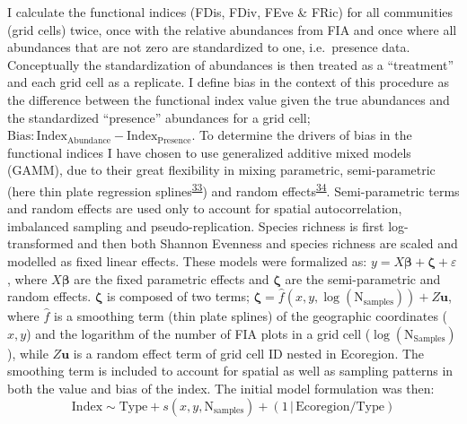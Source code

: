 \documentclass[
  10pt,
]{article}
\begin{document}
I calculate the functional indices (FDis, FDiv, FEve \& FRic) for all communities (grid cells) twice, once with the relative abundances from FIA and once where all abundances that are not zero are standardized to one, i.e.~presence data. Conceptually the standardization of abundances is then treated as a ``treatment'' and each grid cell as a replicate. I define bias in the context of this procedure as the difference between the functional index value given the true abundances and the standardized ``presence'' abundances for a grid cell; \(\mathrm{Bias}: \mathrm{Index_{Abundance}} - \mathrm{Index_{Presence}}\). To determine the drivers of bias in the functional indices I have chosen to use generalized additive mixed models (GAMM), due to their great flexibility in mixing parametric, semi-parametric (here thin plate regression splines\textsuperscript{\protect\hyperlink{ref-R-mgcv-5}{33}}) and random effects\textsuperscript{\protect\hyperlink{ref-R-gamm4}{34}}. Semi-parametric terms and random effects are used only to account for spatial autocorrelation, imbalanced sampling and pseudo-replication. Species richness is first log-transformed and then both Shannon Evenness and species richness are scaled and modelled as fixed linear effects. These models were formalized as: \(y = X\boldsymbol{\beta} + \boldsymbol{\zeta} + \varepsilon\), where \(X\boldsymbol{\beta}\) are the fixed parametric effects and \(\boldsymbol{\zeta}\) are the semi-parametric and random effects. \(\boldsymbol{\zeta}\) is composed of two terms; \(\mathbf{\zeta} = \hat{f}(x,y,\log(\mathrm{N_{samples}}))+Z\mathbf{u}\), where \(\hat f\) is a smoothing term (thin plate splines) of the geographic coordinates (\(x,y\)) and the logarithm of the number of FIA plots in a grid cell (\(\log(\mathrm{N_{Samples}})\)), while \(Z\mathbf{u}\) is a random effect term of grid cell ID nested in Ecoregion. The smoothing term is included to account for spatial as well as sampling patterns in both the value and bias of the index. The initial model formulation was then:
\[\mathrm{Index} \sim \mathrm{Type} + s(x,y,\mathrm{N_{samples}}) + (1\,|\,\mathrm{Ecoregion/Type})\]
\end{document}
